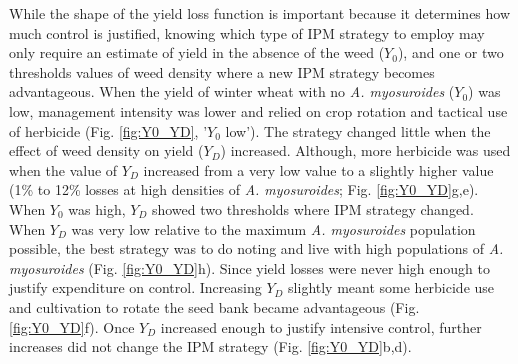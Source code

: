 \documentclass[9pt,twocolumn,twoside,lineno]{pnas-new}
\begin{document}
While the shape of the yield loss function is important because it determines how much control is justified, knowing which type of IPM strategy to employ may only require an estimate of yield in the absence of the weed ($Y_0$), and one or two thresholds values of weed density where a new IPM strategy becomes advantageous. When the yield of winter wheat with no \textit{A. myosuroides} ($Y_0$) was low, management intensity was lower and relied on crop rotation and tactical use of herbicide (Fig. \ref{fig:Y0_YD}, '$Y_0$ low'). The strategy changed little when the effect of weed density on yield ($Y_D$) increased. Although, more herbicide was used when the value of $Y_D$ increased from a very low value to a slightly higher value (1\% to 12\% losses at high densities of \textit{A. myosuroides}; Fig. \ref{fig:Y0_YD}g,e). When $Y_0$ was high, $Y_D$ showed two thresholds where IPM strategy changed. When $Y_D$ was very low relative to the maximum \textit{A. myosuroides} population possible, the best strategy was to do noting and live with high populations of \textit{A. myosuroides} (Fig. \ref{fig:Y0_YD}h). Since yield losses were never high enough to justify expenditure on control. Increasing $Y_D$ slightly meant some herbicide use and cultivation to rotate the seed bank became advantageous (Fig. \ref{fig:Y0_YD}f). Once $Y_D$ increased enough to justify intensive control, further increases did not change the IPM strategy (Fig. \ref{fig:Y0_YD}b,d). 
\end{document}

